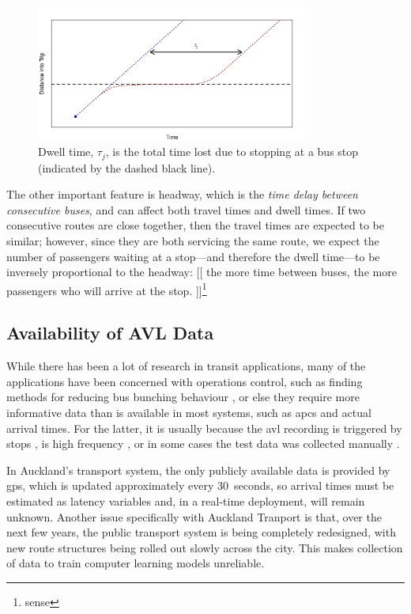 \documentclass[12pt,a4paper]{article}
\begin{document}
\begin{figure}[bt]
  \centering
  \includegraphics[width=0.8\textwidth]{dwell_time.png}
  \caption{Dwell time, $\tau_j$, is the total time lost due to stopping at a bus stop (indicated by the dashed black line).}
  \label{fig:dwell-time}
\end{figure}

The other important feature is headway,
which is the \emph{time delay between consecutive buses},
and can affect both travel times and dwell times.
If two consecutive routes are close together,
then the travel times are expected to be similar;
however, since they are both servicing the same route,
we expect the number of passengers waiting at a stop---and therefore
the dwell time---to be inversely proportional to the headway:
[[ the more time between buses,
the more passengers who will arrive at the stop. ]]\footnote{sense}





\subsection{Availability of AVL Data}
\label{sec:data-types}

While there has been a lot of research in transit applications,
many of the applications have been concerned with operations control,
such as finding methods for reducing bus bunching behaviour \citep{hans-etal:2015},
or else they require more informative data than is available in most systems,
such as \glspl{apc} and actual arrival times.
For the latter, it is usually because the \gls{avl} recording is triggered by stops
\citep{hans-etal:2015},
is high frequency \citep{chang-etal:2010},
or in some cases the test data was collected manually
\citep{yu-etal:2010}.


In Auckland's transport system, the only publicly available data is provided
by \gls{gps}, which is updated approximately every 30~seconds,
so arrival times must be estimated as latency variables and,
in a real-time deployment, will remain unknown.
Another issue specifically with Auckland Tranport is that,
over the next few years,
the public transport system is being completely redesigned,
with new route structures being rolled out slowly across the city.
This makes collection of data to train computer learning models unreliable.
\end{document}

